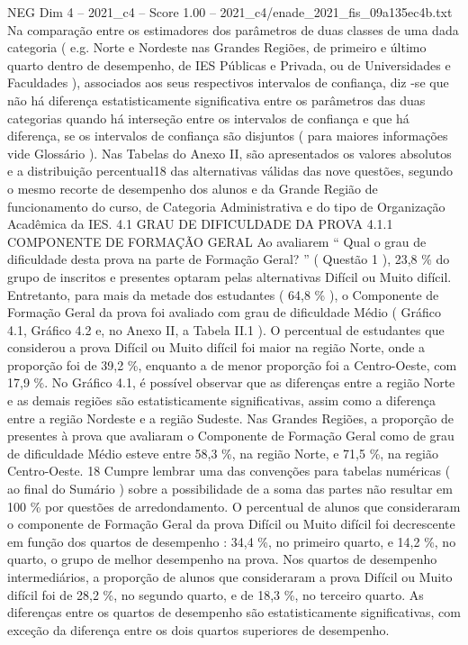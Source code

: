 \begin{textsample}{NEG Dim 4 – 2021\_c4 – Score 1.00 – 2021\_c4/enade\_2021\_fis\_09a135ec4b.txt}
Na comparação entre os estimadores dos parâmetros de duas classes de uma dada categoria ( e.g.
Norte e Nordeste nas Grandes Regiões, de primeiro e último quarto dentro de desempenho, de IES Públicas e Privada, ou de Universidades e Faculdades ), associados aos seus respectivos intervalos de confiança, diz -se que não há diferença estatisticamente significativa entre os parâmetros das duas categorias quando há interseção entre os intervalos de confiança e que há diferença, se os intervalos de confiança são disjuntos ( para maiores informações vide Glossário ).
Nas Tabelas do Anexo II, são apresentados os valores absolutos e a distribuição percentual18 das alternativas válidas das nove questões, segundo o mesmo recorte de desempenho dos alunos e da Grande Região de funcionamento do curso, de Categoria Administrativa e do tipo de Organização Acadêmica da IES. 4.1 GRAU DE DIFICULDADE DA PROVA 4.1.1 COMPONENTE DE FORMAÇÃO GERAL Ao avaliarem “ Qual o grau de dificuldade desta prova na parte de Formação Geral? ” ( Questão 1 ), 23,8 \% do grupo de inscritos e presentes optaram pelas alternativas Difícil ou Muito difícil.
Entretanto, para mais da metade dos estudantes ( 64,8 \% ), o Componente de Formação Geral da prova foi avaliado com grau de dificuldade Médio ( Gráfico 4.1, Gráfico 4.2 e, no Anexo II, a Tabela II.1 ).
O percentual de estudantes que considerou a prova Difícil ou Muito difícil foi maior na região Norte, onde a proporção foi de 39,2 \%, enquanto a de menor proporção foi a Centro-Oeste, com 17,9 \%.
No Gráfico 4.1, é possível observar que as diferenças entre a região Norte e as demais regiões são estatisticamente significativas, assim como a diferença entre a região Nordeste e a região Sudeste.
Nas Grandes Regiões, a proporção de presentes à prova que avaliaram o Componente de Formação Geral como de grau de dificuldade Médio esteve entre 58,3 \%, na região Norte, e 71,5 \%, na região Centro-Oeste. 18 Cumpre lembrar uma das convenções para tabelas numéricas ( ao final do Sumário ) sobre a possibilidade de a soma das partes não resultar em 100 \% por questões de arredondamento.
O percentual de alunos que consideraram o componente de Formação Geral da prova Difícil ou Muito difícil foi decrescente em função dos quartos de desempenho : 34,4 \%, no primeiro quarto, e 14,2 \%, no quarto, o grupo de melhor desempenho na prova.
Nos quartos de desempenho intermediários, a proporção de alunos que consideraram a prova Difícil ou Muito difícil foi de 28,2 \%, no segundo quarto, e de 18,3 \%, no terceiro quarto.
As diferenças entre os quartos de desempenho são estatisticamente significativas, com exceção da diferença entre os dois quartos superiores de desempenho.

\end{textsample}
